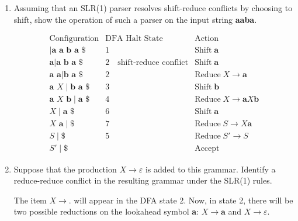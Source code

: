 \documentclass[11pt]{article}
\begin{document}
\begin{enumerate}
\begin{enumerate}
\item Assuming that an SLR(1) parser resolves shift-reduce conflicts
by choosing to shift, show the operation of such a parser on the input
string \textbf{aaba}.

\[
\begin{array}{lll}
\mathrm{Configuration} & \mbox{DFA Halt State} & \mathrm{Action} \\
\hline
\mid \textbf{a a b a \$} & 1 & \mathrm{Shift} \; \textbf{a} \\
\textbf{a} \mid \textbf{a b a \$}
& 2 \quad \mbox{shift-reduce conflict}
& \mathrm{Shift} \; \textbf{a} \\
\textbf{a a} \mid \textbf{b a \$} & 2
& \mathrm{Reduce} \; X \rightarrow \textbf{a} \\
\textbf{a }X \mid \textbf{b a \$} & 3
& \mathrm{Shift} \; \textbf{b} \\
\textbf{a } X \textbf{ b} \mid \textbf{a \$} & 4
& \mathrm{Reduce} \; X \rightarrow \textbf{a} X \textbf{b} \\
X \mid \textbf{a \$} & 6 & \mathrm{Shift} \; \textbf{a} \\
X \textbf{ a} \mid \textbf{\$} & 7
& \mathrm{Reduce} \; S \rightarrow X \textbf{a} \\
S \mid \textbf{\$} & 5 & \mathrm{Reduce} \; S' \rightarrow S \\
S' \mid \textbf{\$} & & \mathrm{Accept}
\end{array}
\]

\item Suppose that the production $X \rightarrow \varepsilon$ is added
to this grammar.  Identify a reduce-reduce conflict in the resulting
grammar under the SLR(1) rules.

The item $X \rightarrow \textbf{.}$ will appear in the DFA state 2.
Now, in state 2, there will be two possible reductions on the
lookahead symbol \textbf{a}: $X \rightarrow \textbf{a}$ and
$X \rightarrow \varepsilon$.

\end{enumerate}

\end{enumerate}
\end{document}
